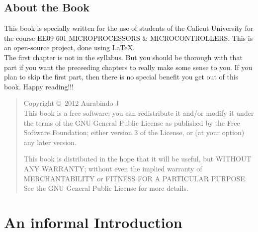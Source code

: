 \documentclass{book}
\begin{document}

\newcommand{\HRule}{\rule{\linewidth}{1mm}}



\pagestyle{headings}
\setcounter{page}{1}

\section*{{\huge About the Book}}



This book is specially written for the use of students of the Calicut University
for the course EE09-601 MICROPROCESSORS \& MICROCONTROLLERS. This is an
open-source project, done using \LaTeX .\\[.1cm]

\noindent The first chapter is not in the syllabus. But you should be thorough with that part if you want the preceeding chapters to really make some sense to you. If you plan to skip the first part, then there is no special benefit you get out of this book. Happy reading!!!
\\[4.5cm]

\begin{quote}

Copyright \copyright\ 2012 Aurabindo J\\[.3cm ]
This book is a free software; you can redistribute it and/or modify it
under the terms of the GNU General Public License as published by
the Free Software Foundation; either version 3 of the License, or
(at your option) any later version.

This book is distributed in the hope that it will be useful, but WITHOUT
ANY WARRANTY; without even the implied warranty of MERCHANTABILITY
or FITNESS FOR A PARTICULAR PURPOSE.  See the GNU General Public
License for more details.

\end{quote}
\pagebreak



\tableofcontents
\newpage

\setcounter{page}{1}


\chapter{An informal Introduction}
\end{document}
